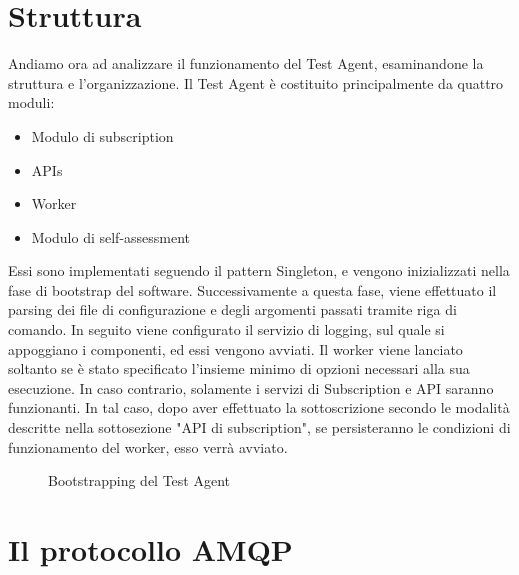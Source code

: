 \section{Struttura}
Andiamo ora ad analizzare il funzionamento del Test Agent, esaminandone la struttura e l'organizzazione.
Il Test Agent è costituito principalmente da quattro moduli:
\begin{itemize}
\item Modulo di subscription
\item APIs
\item Worker
\item Modulo di self-assessment
\end{itemize}
Essi sono implementati seguendo il pattern Singleton, e vengono inizializzati nella fase di bootstrap del software.
Successivamente a questa fase, viene effettuato il parsing dei file di configurazione e degli argomenti passati tramite riga di comando.
In seguito viene configurato il servizio di logging, sul quale si appoggiano i componenti, ed essi vengono avviati.
Il worker viene lanciato soltanto se è stato specificato l'insieme minimo di opzioni necessari alla sua esecuzione. In caso contrario, solamente i servizi di Subscription e API saranno funzionanti.
In tal caso, dopo aver effettuato la sottoscrizione secondo le modalità descritte nella sottosezione "API di subscription", se persisteranno le condizioni di funzionamento del worker, esso verrà avviato.
\begin{figure}[H]
\centering
{}
\caption{Bootstrapping del Test Agent}\label{fig:testagent}
\end{figure}

\section{Il protocollo AMQP}

